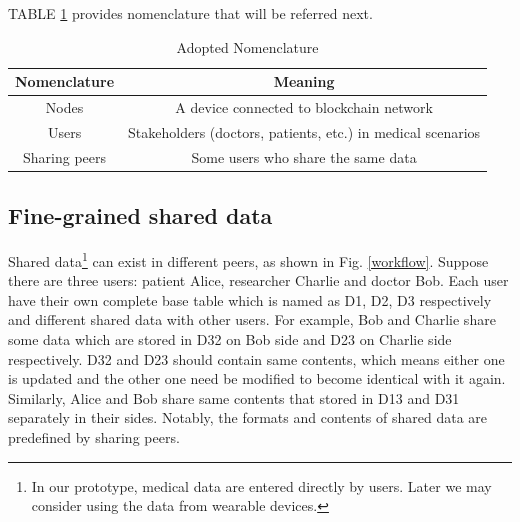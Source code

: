 \documentclass[conference]{IEEEtran}
\begin{document}
     
     TABLE \ref{nomenclature} provides nomenclature that will be referred next.
     
     \begin{table}[htbp]
     	\caption{Adopted Nomenclature}
     	\begin{center}
     		\begin{tabular}{c|c}
     			\hline
     			Nomenclature & Meaning \\
     			\hline
     			Nodes & A device connected to blockchain network  \\
     			Users &   Stakeholders (doctors, patients, etc.) in medical scenarios\\ 
     			Sharing peers &  Some users who share the same data  \\
     			\hline
     		\end{tabular}
     		\label{nomenclature}
     	\end{center}
     \end{table}
     


\subsection{Fine-grained shared data}
\label{fine-grained}


Shared data\footnote{In our prototype, medical data are entered directly by users. Later we may consider using the data from wearable devices.} can exist in different peers, as shown in Fig. \ref{workflow}.  Suppose there are three users: patient Alice, researcher Charlie and doctor Bob. Each user have their own complete base table which is named as D1, D2, D3 respectively and different shared data with other users. For example, Bob and Charlie share some data which are stored in D32 on Bob side and D23 on Charlie side respectively. D32 and D23 should contain same contents, which means either one is updated and the other one need be modified to become identical with it again. Similarly, Alice and Bob share same contents that stored in D13 and D31 separately in their sides. Notably, the formats and contents of shared data are predefined by sharing peers. 
\end{document}
